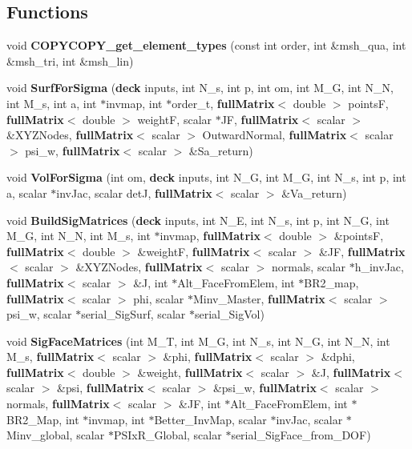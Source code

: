 \subsection*{Functions}
\begin{DoxyCompactItemize}
\item 
void {\bfseries C\-O\-P\-Y\-C\-O\-P\-Y\-\_\-get\-\_\-element\-\_\-types} (const int order, int \&msh\-\_\-qua, int \&msh\-\_\-tri, int \&msh\-\_\-lin)\label{mixedform_8h_a25f554c64d191f60722540ae44d22af4}

\item 
void {\bfseries Surf\-For\-Sigma} ({\bf deck} inputs, int N\-\_\-s, int p, int om, int M\-\_\-\-G, int N\-\_\-\-N, int M\-\_\-s, int a, int $\ast$invmap, int $\ast$order\-\_\-t, {\bf full\-Matrix}$<$ double $>$ points\-F, {\bf full\-Matrix}$<$ double $>$ weight\-F, scalar $\ast$J\-F, {\bf full\-Matrix}$<$ scalar $>$ \&X\-Y\-Z\-Nodes, {\bf full\-Matrix}$<$ scalar $>$ Outward\-Normal, {\bf full\-Matrix}$<$ scalar $>$ psi\-\_\-w, {\bf full\-Matrix}$<$ scalar $>$ \&Sa\-\_\-return)\label{mixedform_8h_a2dda58420264620189c2619c12aaa079}

\item 
void {\bfseries Vol\-For\-Sigma} (int om, {\bf deck} inputs, int N\-\_\-\-G, int M\-\_\-\-G, int N\-\_\-s, int p, int a, scalar $\ast$inv\-Jac, scalar det\-J, {\bf full\-Matrix}$<$ scalar $>$ \&Va\-\_\-return)\label{mixedform_8h_a38a6a6616acc60797d6248aae1de9b5a}

\item 
void {\bfseries Build\-Sig\-Matrices} ({\bf deck} inputs, int N\-\_\-\-E, int N\-\_\-s, int p, int N\-\_\-\-G, int M\-\_\-\-G, int N\-\_\-\-N, int M\-\_\-s, int $\ast$invmap, {\bf full\-Matrix}$<$ double $>$ \&points\-F, {\bf full\-Matrix}$<$ double $>$ \&weight\-F, {\bf full\-Matrix}$<$ scalar $>$ \&J\-F, {\bf full\-Matrix}$<$ scalar $>$ \&X\-Y\-Z\-Nodes, {\bf full\-Matrix}$<$ scalar $>$ normals, scalar $\ast$h\-\_\-inv\-Jac, {\bf full\-Matrix}$<$ scalar $>$ \&J, int $\ast$Alt\-\_\-\-Face\-From\-Elem, int $\ast$B\-R2\-\_\-map, {\bf full\-Matrix}$<$ scalar $>$ phi, scalar $\ast$Minv\-\_\-\-Master, {\bf full\-Matrix}$<$ scalar $>$ psi\-\_\-w, scalar $\ast$serial\-\_\-\-Sig\-Surf, scalar $\ast$serial\-\_\-\-Sig\-Vol)\label{mixedform_8h_a96849be7a101c7a4c3ab6082c51cce75}

\item 
void {\bf Sig\-Face\-Matrices} (int M\-\_\-\-T, int M\-\_\-\-G, int N\-\_\-s, int N\-\_\-\-G, int N\-\_\-\-N, int M\-\_\-s, {\bf full\-Matrix}$<$ scalar $>$ \&phi, {\bf full\-Matrix}$<$ scalar $>$ \&dphi, {\bf full\-Matrix}$<$ double $>$ \&weight, {\bf full\-Matrix}$<$ scalar $>$ \&J, {\bf full\-Matrix}$<$ scalar $>$ \&psi, {\bf full\-Matrix}$<$ scalar $>$ \&psi\-\_\-w, {\bf full\-Matrix}$<$ scalar $>$ normals, {\bf full\-Matrix}$<$ scalar $>$ \&J\-F, int $\ast$Alt\-\_\-\-Face\-From\-Elem, int $\ast$B\-R2\-\_\-\-Map, int $\ast$invmap, int $\ast$Better\-\_\-\-Inv\-Map, scalar $\ast$inv\-Jac, scalar $\ast$Minv\-\_\-global, scalar $\ast$P\-S\-Ix\-R\-\_\-\-Global, scalar $\ast$serial\-\_\-\-Sig\-Face\-\_\-from\-\_\-\-D\-O\-F)
\end{DoxyCompactItemize}


